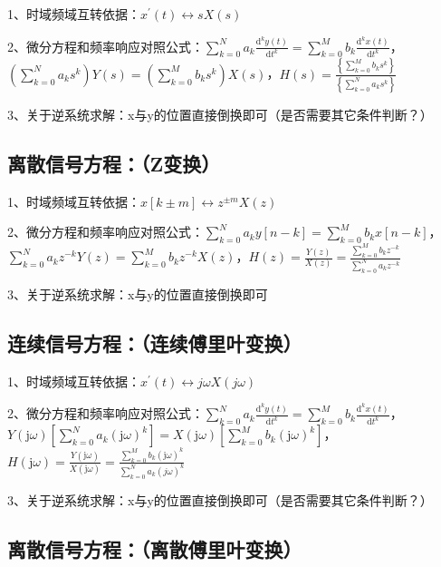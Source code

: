 1、时域频域互转依据：$x^{\prime}(t) \leftrightarrow s X(s)$

2、微分方程和频率响应对照公式：$\sum_{k=0}^{N} a_{k} \frac{\mathrm{d}^{k} y(t)}{\mathrm{d} t^{k}}=\sum_{k=0}^{M} b_{k} \frac{\mathrm{d}^{k} x(t)}{\mathrm{d} t^{k}}$，$\left(\sum_{k=0}^{N} a_{k} s^{k}\right) Y(s)=\left(\sum_{k=0}^{M} b_{k} s^{k}\right) X(s)$，$H(s)=\frac{\left\{\sum_{k=0}^{M} b_{k} s^{k}\right\}}{\left\{\sum_{k=0}^{N} a_{k} s^{k}\right\}}$

3、关于逆系统求解：x与y的位置直接倒换即可（是否需要其它条件判断？）



\subsection{离散信号方程：（Z变换）}

1、时域频域互转依据：$x[k \pm m] \leftrightarrow z^{\pm m} X(z)$

2、微分方程和频率响应对照公式：$\sum_{k=0}^{N} a_{k} y[n-k]=\sum_{k=0}^{M} b_{k} x[n-k]$，$\sum_{k=0}^{N} a_{k} z^{-k} Y(z)=\sum_{k=0}^{M} b_{k} z^{-k} X(z)$，$H(z)=\frac{Y(z)}{X(z)}=\frac{\sum_{k=0}^{M} b_{k} z^{-k}}{\sum_{k=0}^{N} a_{k} z^{-k}}$

3、关于逆系统求解：x与y的位置直接倒换即可



\subsection{连续信号方程：（连续傅里叶变换）}

1、时域频域互转依据：$x^{\prime}(t) \leftrightarrow j \omega X(j \omega)$

2、微分方程和频率响应对照公式：$\sum_{k=0}^{N} a_{k} \frac{\mathrm{d}^{k} y(t)}{\mathrm{d} t^{k}}=\sum_{k=0}^{M} b_{k} \frac{\mathrm{d}^{k} x(t)}{\mathrm{d} t^{k}}$，$Y(\mathrm{j} \omega)\left[\sum_{k=0}^{N} a_{k}(\mathrm{j} \omega)^{k}\right]=X(\mathrm{j} \omega)\left[\sum_{k=0}^{M} b_{k}(\mathrm{j} \omega)^{k}\right]$，$H(\mathrm{j} \omega)=\frac{Y(\mathrm{j} \omega)}{X(\mathrm{j} \omega)}=\frac{\sum_{k=0}^{M} b_{k}(\mathrm{j} \omega)^{k}}{\sum_{k=0}^{N} a_{k}(j \omega)^{k}}$

3、关于逆系统求解：x与y的位置直接倒换即可（是否需要其它条件判断？）



\subsection{离散信号方程：（离散傅里叶变换）}

